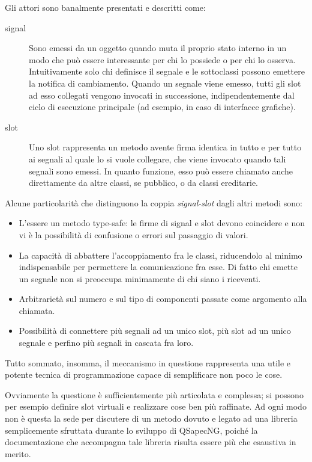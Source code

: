 Gli attori sono banalmente presentati e descritti come:
\begin{description}
 \item[signal] Sono emessi da un oggetto quando muta il proprio stato interno in un modo che può essere interessante per chi lo possiede o per chi lo osserva. Intuitivamente solo chi definisce il segnale e le sottoclassi possono emettere la notifica di cambiamento. Quando un segnale viene emesso, tutti gli slot ad esso collegati vengono invocati in successione, indipendentemente dal ciclo di esecuzione principale (ad esempio, in caso di interfacce grafiche).
 \item[slot] Uno slot rappresenta un metodo avente firma identica in tutto e per tutto ai segnali al quale lo si vuole collegare, che viene invocato quando tali segnali sono emessi. In quanto funzione, esso può essere chiamato anche direttamente da altre classi, se pubblico, o da classi ereditarie.
\end{description}

Alcune particolarità che distinguono la coppia \textit{signal-slot} dagli altri metodi sono:
\begin{itemize}
 \item L'essere un metodo type-safe: le firme di signal e slot devono coincidere e non vi è la possibilità di confusione o errori sul passaggio di valori.
 \item La capacità di abbattere l'accoppiamento fra le classi, riducendolo al minimo indispensabile per permettere la comunicazione fra esse. Di fatto chi emette un segnale non si preoccupa minimamente di chi siano i riceventi.
 \item Arbitrarietà sul numero e sul tipo di componenti passate come argomento alla chiamata.
 \item Possibilità di connettere più segnali ad un unico slot, più slot ad un unico segnale e perfino più segnali in cascata fra loro.
\end{itemize}
Tutto sommato, insomma, il meccanismo in questione rappresenta una utile e potente tecnica di programmazione capace di semplificare non poco le cose.

Ovviamente la questione è sufficientemente più articolata e complessa; si possono per esempio definire slot virtuali e realizzare cose ben più raffinate. Ad ogni modo non è questa la sede per discutere di un metodo dovuto e legato ad una libreria semplicemente sfruttata durante lo sviluppo di QSapecNG, poiché la documentazione che accompagna tale libreria risulta essere più che esaustiva in merito.

